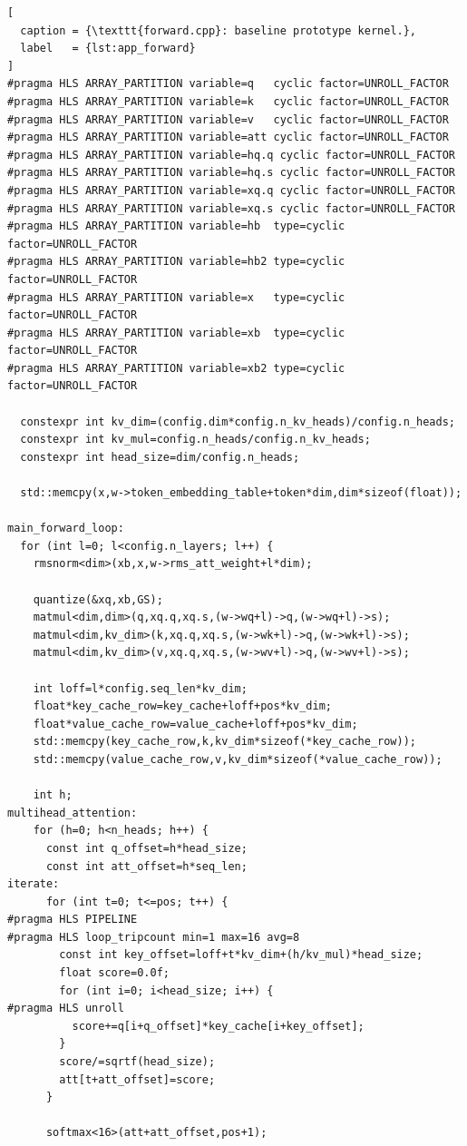 \begin{appendices}
\begin{lstlisting}[
  caption = {\texttt{forward.cpp}: baseline prototype kernel.},
  label   = {lst:app_forward}
]
#pragma HLS ARRAY_PARTITION variable=q   cyclic factor=UNROLL_FACTOR
#pragma HLS ARRAY_PARTITION variable=k   cyclic factor=UNROLL_FACTOR
#pragma HLS ARRAY_PARTITION variable=v   cyclic factor=UNROLL_FACTOR
#pragma HLS ARRAY_PARTITION variable=att cyclic factor=UNROLL_FACTOR
#pragma HLS ARRAY_PARTITION variable=hq.q cyclic factor=UNROLL_FACTOR
#pragma HLS ARRAY_PARTITION variable=hq.s cyclic factor=UNROLL_FACTOR
#pragma HLS ARRAY_PARTITION variable=xq.q cyclic factor=UNROLL_FACTOR
#pragma HLS ARRAY_PARTITION variable=xq.s cyclic factor=UNROLL_FACTOR
#pragma HLS ARRAY_PARTITION variable=hb  type=cyclic factor=UNROLL_FACTOR
#pragma HLS ARRAY_PARTITION variable=hb2 type=cyclic factor=UNROLL_FACTOR
#pragma HLS ARRAY_PARTITION variable=x   type=cyclic factor=UNROLL_FACTOR
#pragma HLS ARRAY_PARTITION variable=xb  type=cyclic factor=UNROLL_FACTOR
#pragma HLS ARRAY_PARTITION variable=xb2 type=cyclic factor=UNROLL_FACTOR

  constexpr int kv_dim=(config.dim*config.n_kv_heads)/config.n_heads;
  constexpr int kv_mul=config.n_heads/config.n_kv_heads;
  constexpr int head_size=dim/config.n_heads;

  std::memcpy(x,w->token_embedding_table+token*dim,dim*sizeof(float));

main_forward_loop:
  for (int l=0; l<config.n_layers; l++) {
    rmsnorm<dim>(xb,x,w->rms_att_weight+l*dim);

    quantize(&xq,xb,GS);
    matmul<dim,dim>(q,xq.q,xq.s,(w->wq+l)->q,(w->wq+l)->s);
    matmul<dim,kv_dim>(k,xq.q,xq.s,(w->wk+l)->q,(w->wk+l)->s);
    matmul<dim,kv_dim>(v,xq.q,xq.s,(w->wv+l)->q,(w->wv+l)->s);

    int loff=l*config.seq_len*kv_dim;
    float*key_cache_row=key_cache+loff+pos*kv_dim;
    float*value_cache_row=value_cache+loff+pos*kv_dim;
    std::memcpy(key_cache_row,k,kv_dim*sizeof(*key_cache_row));
    std::memcpy(value_cache_row,v,kv_dim*sizeof(*value_cache_row));

    int h;
multihead_attention:
    for (h=0; h<n_heads; h++) {
      const int q_offset=h*head_size;
      const int att_offset=h*seq_len;
iterate:
      for (int t=0; t<=pos; t++) {
#pragma HLS PIPELINE
#pragma HLS loop_tripcount min=1 max=16 avg=8
        const int key_offset=loff+t*kv_dim+(h/kv_mul)*head_size;
        float score=0.0f;
        for (int i=0; i<head_size; i++) {
#pragma HLS unroll
          score+=q[i+q_offset]*key_cache[i+key_offset];
        }
        score/=sqrtf(head_size);
        att[t+att_offset]=score;
      }

      softmax<16>(att+att_offset,pos+1);


\end{lstlisting}
\end{appendices}
